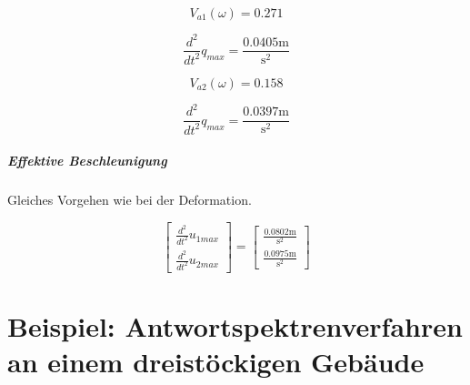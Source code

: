 \documentclass[
  letterpaper,
  DIV=11]{scrreprt}
\let\oldparagraph\paragraph
\renewcommand{\paragraph}[1]{\oldparagraph{#1}\mbox{}}
\begin{document}
\begin{equation*}V_{a1}{\left(\omega \right)} = 0.271\end{equation*}

\begin{equation*}\frac{d^{2}}{d t^{2}} q_{max} = \frac{0.0405 \text{m}}{\text{s}^{2}}\end{equation*}

\begin{equation*}V_{a2}{\left(\omega \right)} = 0.158\end{equation*}

\begin{equation*}\frac{d^{2}}{d t^{2}} q_{max} = \frac{0.0397 \text{m}}{\text{s}^{2}}\end{equation*}

\hypertarget{effektive-beschleunigung}{%
\paragraph{Effektive Beschleunigung}\label{effektive-beschleunigung}}

Gleiches Vorgehen wie bei der Deformation.

\begin{equation*}\left[\begin{matrix}\frac{d^{2}}{d t^{2}} u_{1max}\\\frac{d^{2}}{d t^{2}} u_{2max}\end{matrix}\right] = \left[\begin{matrix}\frac{0.0802 \text{m}}{\text{s}^{2}}\\\frac{0.0975 \text{m}}{\text{s}^{2}}\end{matrix}\right]\end{equation*}

\hypertarget{beispiel-antwortspektrenverfahren-an-einem-dreistuxf6ckigen-gebuxe4ude}{%
\chapter{Beispiel: Antwortspektrenverfahren an einem dreistöckigen
Gebäude}\label{beispiel-antwortspektrenverfahren-an-einem-dreistuxf6ckigen-gebuxe4ude}}
\end{document}
